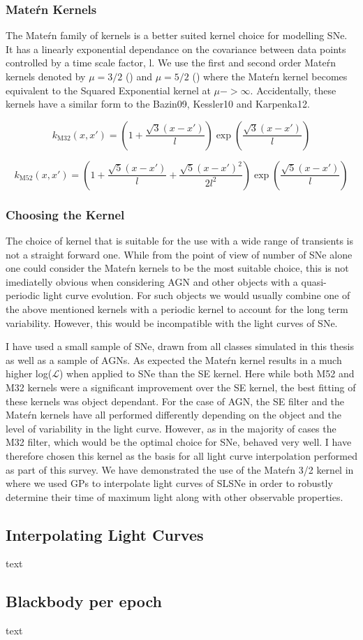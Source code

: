 \subsubsection{Mate\'rn Kernels}
The Mate\'rn family of kernels is a better suited kernel choice for modelling SNe. It has a linearly exponential dependance on the covariance between data points controlled by a time scale factor, l. We use the first and second order Mate\'rn kernels denoted by $\mu = 3/2$ () and $\mu = 5/2$ () where the Mate\'rn kernel becomes equivalent to the Squared Exponential kernel at $\mu -> \infty$. Accidentally, these kernels have a similar form to the Bazin09, Kessler10 and Karpenka12.

\begin{equation} \label{eq:M32}
  k_{\textrm{M32}}(x,x') = \left(1 + \frac{\sqrt{3}(x - x')}{l}\right) \exp \left( \frac{\sqrt{3}(x - x')}{l} \right)
\end{equation}

\begin{equation} \label{eq:M52}
  k_{\textrm{M52}}(x,x') = \left(1 + \frac{\sqrt{5}(x - x')}{l} + \frac{\sqrt{5}(x - x')^2}{2l^2}\right) \exp \left( \frac{\sqrt{5}(x - x')}{l} \right)
\end{equation}

\subsubsection{Choosing the Kernel}
The choice of kernel that is suitable for the use with a wide range of transients is not a straight forward one. While from the point of view of number of SNe alone one could consider the Mate\'rn kernels to be the most suitable choice, this is not imediatelly obvious when considering AGN and other objects with a quasi-periodic light curve evolution. For such objects we would usually combine one of the above mentioned kernels with a periodic kernel to account for the long term variability. However, this would be incompatible with the light curves of SNe.

I have used a small sample of SNe, drawn from all classes simulated in this thesis as well as a sample of AGNs. As expected the Mate\'rn kernel results in a much higher log($\mathcal{L}$) when applied to SNe than the SE kernel. Here while both M52 and M32 kernels were a significant improvement over the SE kernel, the best fitting of these kernels was object dependant. For the case of AGN, the SE filter and the Mate\'rn kernels have all performed differently depending on the object and the level of variability in the light curve. However, as in the majority of cases the M32 filter, which would be the optimal choice for SNe, behaved very well. I have therefore chosen this kernel as the basis for all light curve interpolation performed as part of this survey. We have demonstrated the use of the Mate\'rn 3/2 kernel in \citet{Inserra2018} where we used GPs to interpolate light curves of SLSNe in order to robustly determine their time of maximum light along with other observable properties.

\subsection{Interpolating Light Curves}
text
\subsection{Blackbody per epoch}
text
